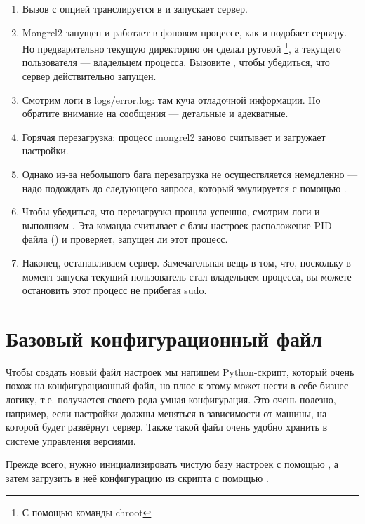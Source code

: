 \begin{enumerate}
\item Вызов  с опцией  транслируется в
     и запускает
    сервер.
\item Mongrel2 запущен и работает в фоновом процессе, как и подобает
    серверу. Но предварительно текущую директорию он сделал рутовой
    \footnote{С помощью команды chroot}, а текущего пользователя ---
    владельцем процесса. Вызовите , чтобы убедиться, что
    сервер действительно запущен.
\item Смотрим логи в logs/error.log: там куча отладочной информации.
    Но обратите внимание на сообщения --- детальные и адекватные.
\item Горячая перезагрузка: процесс mongrel2 заново считывает и загружает
    настройки.
\item Однако из-за небольшого бага перезагрузка не осуществляется
    немедленно --- надо подождать до следующего запроса, который
    эмулируется с помощью .
\item Чтобы убедиться, что перезагрузка прошла успешно, смотрим логи и
    выполняем . Эта команда считывает с базы настроек
    расположение PID-файла () и проверяет, запущен
    ли этот процесс.
\item Наконец, останавливаем сервер. Замечательная вещь в том, что,
    поскольку в момент запуска текущий пользователь стал владельцем
    процесса, вы можете остановить этот процесс не прибегая sudo.
\end{enumerate}

\section{Базовый конфигурационный файл}

Чтобы создать новый файл настроек мы напишем Python-скрипт, который
очень похож на конфигурационный файл, но плюс к этому может нести в
себе бизнес-логику, т.е. получается своего рода умная конфигурация.
Это очень полезно, например, если настройки должны меняться в
зависимости от машины, на которой будет развёрнут сервер. Также такой
файл очень удобно хранить в системе управления версиями.

Прежде всего, нужно инициализировать чистую базу настроек с помощью
, а затем загрузить в неё конфигурацию из скрипта с
помощью .

